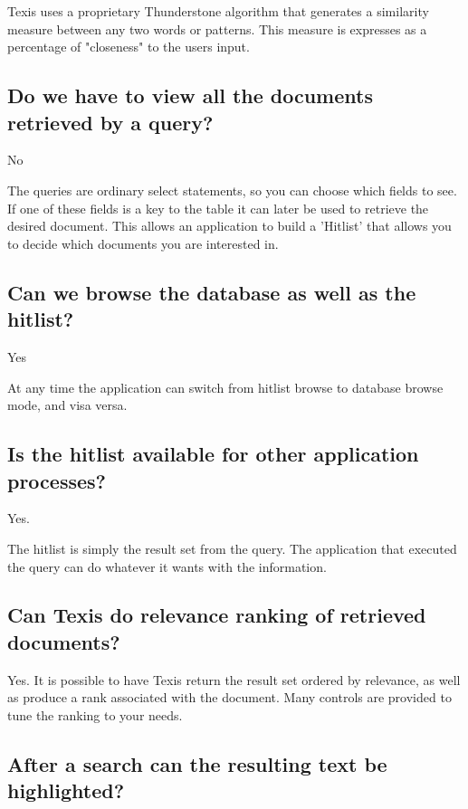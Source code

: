 Texis uses a proprietary Thunderstone algorithm that generates a
similarity measure between any two words or patterns. This measure
is expresses as a percentage of "closeness" to the users input.

\subsection{Do we have to view all the documents retrieved by a query?}

No

The queries are ordinary select statements, so you can choose which
fields to see.  If one of these fields is a key to the table it can
later be used to retrieve the desired document.  This allows an
application to build a 'Hitlist' that allows you to decide which
documents you are interested in.

\subsection{Can we browse the database as well as the hitlist?}

Yes

At any time the application can switch from hitlist browse to database
browse mode, and visa versa.

\subsection{Is the hitlist available for other application processes?}

Yes.

The hitlist is simply the result set from the query.  The application
that executed the query can do whatever it wants with the information.

\subsection{Can Texis do relevance ranking of retrieved documents?}

Yes.  It is possible to have Texis return the result set ordered by
relevance, as well as produce a rank associated with the document.
Many controls are provided to tune the ranking to your needs.

\subsection{After a search can the resulting text be highlighted?}

